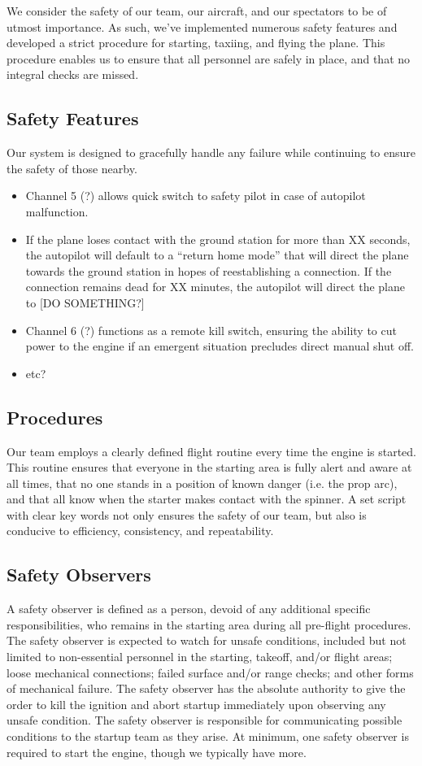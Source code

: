 \documentclass[10pt]{report}
\begin{document}
We consider the safety of our team, our aircraft, and our spectators to be of utmost importance.  As such, we've implemented numerous safety features and developed a strict procedure for starting, taxiing, and flying the plane.  This procedure enables us to ensure that all personnel are safely in place, and that no integral checks are missed.

\subsection{Safety Features}
Our system is designed to gracefully handle any failure while continuing to ensure the safety of those nearby. 
\begin{itemize}
	\setlength{\itemsep}{0cm}
	\setlength{\parskip}{0cm}
	\item Channel 5 (?) allows quick switch to safety pilot in case of autopilot malfunction.
	\item If the plane loses contact with the ground station for more than XX seconds, the autopilot will default to a ``return home mode'' that will direct the plane towards the ground station in hopes of reestablishing a connection.  If the connection remains dead for XX minutes, the autopilot will direct the plane to [DO SOMETHING?]
	\item Channel 6 (?) functions as a remote kill switch, ensuring the ability to cut power to the engine if an emergent situation precludes direct manual shut off.
	\item etc?
\end{itemize}

\subsection{Procedures}
Our team employs a clearly defined flight routine every time the engine is started.  This routine ensures that everyone in the starting area is fully alert and aware at all times, that no one stands in a position of known danger (i.e. the prop arc), and that all know when the starter makes contact with the spinner.  A set script with clear key words not only ensures the safety of our team, but also is conducive to efficiency, consistency, and repeatability.

\subsection{Safety Observers}
A safety observer is defined as a person, devoid of any additional specific responsibilities, who remains in the starting area during all pre-flight procedures.  The safety observer is expected to watch for unsafe conditions, included but not limited to non-essential personnel in the starting, takeoff, and/or flight areas; loose mechanical connections; failed surface and/or range checks; and other forms of mechanical failure.  The safety observer has the absolute authority to give the order to kill the ignition and abort startup immediately upon observing any unsafe condition.  The safety observer is responsible for communicating possible conditions to the startup team as they arise. At minimum, one safety observer is required to start the engine, though we typically have more.
\end{document}
